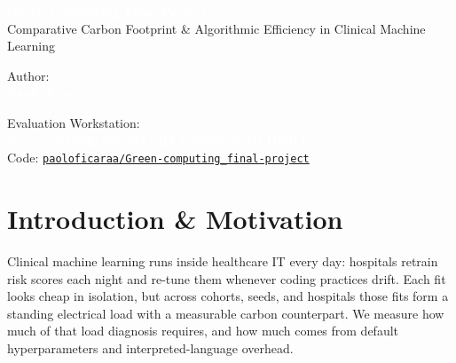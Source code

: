 \documentclass[11pt,a4paper]{article}
\begin{document}
\thispagestyle{empty}

\begin{tcolorbox}[enhanced, colback=primarydark, colframe=primarydark,
  arc=2.5mm, boxrule=0pt, left=12pt, right=12pt, top=10pt, bottom=9pt]
  \raggedright
  {\fontsize{17pt}{20pt}\selectfont\bfseries\textcolor{white}{Green Computing Final Project}}\\[3pt]
  {\fontsize{10pt}{13pt}\selectfont\textcolor{bordergreen}{\textsf{Comparative Carbon Footprint \& Algorithmic Efficiency in Clinical Machine Learning}}}\\[8pt]
  \vspace{2pt}
  \noindent
  \begin{minipage}[t]{0.35\textwidth}
    \raggedright
    \footnotesize\textcolor{gray!30}{Author:}\\
    \textbf{\textcolor{white}{\normalsize Paolo Ficara}}\\[1pt]
  \end{minipage}
  \hfill
  \begin{minipage}[t]{0.62\textwidth}
    \raggedleft
    \footnotesize\textcolor{gray!30}{Evaluation Workstation:}\\
    \scriptsize\textcolor{white}{\textbf{Intel i7-9700K (8C/8T)} \;\textbar\; \textbf{RTX 5060} \;\textbar\; \textbf{16GB DDR4}}\\[1pt]
    \scriptsize\textcolor{bordergreen}{Code: \href{https://codeberg.org/paoloficaraa/Green-computing_final-project}{\texttt{paoloficaraa/Green-computing\_final-project}}}
  \end{minipage}
\end{tcolorbox}
\vspace{2pt}

\section{Introduction \& Motivation}
Clinical machine learning runs inside healthcare IT every day: hospitals
retrain risk scores each night and re-tune them whenever coding practices drift.
Each fit looks cheap in isolation, but across cohorts, seeds, and hospitals
those fits form a standing electrical load with a measurable carbon
counterpart. We measure how much of that load diagnosis requires, and how much
comes from default hyperparameters and interpreted-language overhead.
\end{document}
